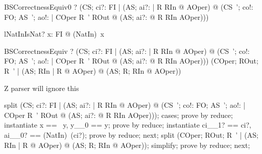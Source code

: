 \begin{theorem}{BSCorrectnessEquiv0} \vdash?
  (\forall CS; ci?: FI  | (\forall AS; ai?: \nat | R \land RIn @ \pre AOper) @
  	(\forall CS~'; co!: FO; AS~'; ao!: \nat | COper \land R~' \land ROut @
  		(\exists AS; ai?: \nat @ R \land RIn \land AOper)))
\end{theorem}


\begin{theorem}{lNatInIsNat}\vdash?
   \forall x: FI @ (NatIn\inv)~x 
\end{theorem}

\begin{theorem}{BSCorrectnessEquiv} \vdash?
  (\forall CS; ci?: FI  | (\forall AS; ai?: \nat | R \land RIn @ \pre AOper) @
  	(\forall CS~'; co!: FO; AS~'; ao!: \nat | COper \land R~' \land ROut @
  		(\exists AS; ai?: \nat @ R \land RIn \land AOper)))
  	\iff
  (\forall COper; ROut; R~' | (\forall AS; RIn | R @ \pre AOper) @ (\exists AS; R; RIn @ AOper))
\end{theorem}

Z parser will ignore this
\begin{zproof}[BSCorrectnessEquiv]
split (\forall CS; ci?: FI  | (\forall AS; ai?: \nat | R \land RIn @ \pre AOper) @
  	(\forall CS~'; co!: FO; AS~'; ao!: \nat | COper \land R~' \land ROut @
  		(\exists AS; ai?: \nat @ R \land RIn \land AOper)));
cases;
prove by reduce;
instantiate x == \ran~y, y\_\_0 == y;
prove by reduce;
instantiate ci\_\_1? == ci?, ai\_\_0? == (NatIn\inv)~(ci?);
prove by reduce;
next;
split (\forall COper; ROut; R~' | (\forall AS; RIn | R @ \pre AOper) @ (\exists AS; R; RIn @ AOper));
simplify;
prove by reduce;
next;
\end{zproof}
